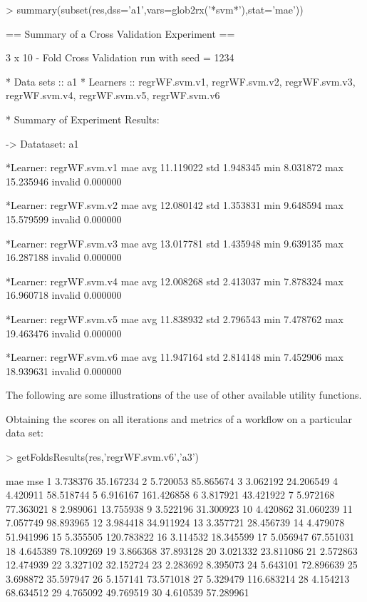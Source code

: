 \documentclass[10pt,a4paper]{article}
\begin{document}
\begin{Schunk}
\begin{Sinput}
> summary(subset(res,dss='a1',vars=glob2rx('*svm*'),stat='mae'))
\end{Sinput}
\begin{Soutput}
== Summary of a  Cross Validation  Experiment ==

 3 x 10 - Fold Cross Validation run with seed =  1234 

* Data sets ::  a1
* Learners  ::  regrWF.svm.v1, regrWF.svm.v2, regrWF.svm.v3, regrWF.svm.v4, regrWF.svm.v5, regrWF.svm.v6

* Summary of Experiment Results:


-> Datataset:  a1 

	*Learner: regrWF.svm.v1 
              mae
avg     11.119022
std      1.948345
min      8.031872
max     15.235946
invalid  0.000000

	*Learner: regrWF.svm.v2 
              mae
avg     12.080142
std      1.353831
min      9.648594
max     15.579599
invalid  0.000000

	*Learner: regrWF.svm.v3 
              mae
avg     13.017781
std      1.435948
min      9.639135
max     16.287188
invalid  0.000000

	*Learner: regrWF.svm.v4 
              mae
avg     12.008268
std      2.413037
min      7.878324
max     16.960718
invalid  0.000000

	*Learner: regrWF.svm.v5 
              mae
avg     11.838932
std      2.796543
min      7.478762
max     19.463476
invalid  0.000000

	*Learner: regrWF.svm.v6 
              mae
avg     11.947164
std      2.814148
min      7.452906
max     18.939631
invalid  0.000000
\end{Soutput}
\end{Schunk}


The following are some illustrations of the use of other available
utility functions.

Obtaining the scores on all iterations and metrics of a workflow on a
particular data set:

\begin{Schunk}
\begin{Sinput}
> getFoldsResults(res,'regrWF.svm.v6','a3')
\end{Sinput}
\begin{Soutput}
        mae        mse
1  3.738376  35.167234
2  5.720053  85.865674
3  3.062192  24.206549
4  4.420911  58.518744
5  6.916167 161.426858
6  3.817921  43.421922
7  5.972168  77.363021
8  2.989061  13.755938
9  3.522196  31.300923
10 4.420862  31.060239
11 7.057749  98.893965
12 3.984418  34.911924
13 3.357721  28.456739
14 4.479078  51.941996
15 5.355505 120.783822
16 3.114532  18.345599
17 5.056947  67.551031
18 4.645389  78.109269
19 3.866368  37.893128
20 3.021332  23.811086
21 2.572863  12.474939
22 3.327102  32.152724
23 2.283692   8.395073
24 5.643101  72.896639
25 3.698872  35.597947
26 5.157141  73.571018
27 5.329479 116.683214
28 4.154213  68.634512
29 4.765092  49.769519
30 4.610539  57.289961
\end{Soutput}
\end{Schunk}
\end{document}
